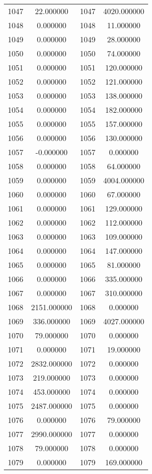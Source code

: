 \documentclass[12pt]{article}
\begin{document}
\begin{longtable}{@{}cccc@{}}
1047 & 22.000000 & 1047 & 4020.000000 \\
1048 & 0.000000 & 1048 & 11.000000 \\
1049 & 0.000000 & 1049 & 28.000000 \\
1050 & 0.000000 & 1050 & 74.000000 \\
1051 & 0.000000 & 1051 & 120.000000 \\
1052 & 0.000000 & 1052 & 121.000000 \\
1053 & 0.000000 & 1053 & 138.000000 \\
1054 & 0.000000 & 1054 & 182.000000 \\
1055 & 0.000000 & 1055 & 157.000000 \\
1056 & 0.000000 & 1056 & 130.000000 \\
1057 & -0.000000 & 1057 & 0.000000 \\
1058 & 0.000000 & 1058 & 64.000000 \\
1059 & 0.000000 & 1059 & 4004.000000 \\
1060 & 0.000000 & 1060 & 67.000000 \\
1061 & 0.000000 & 1061 & 129.000000 \\
1062 & 0.000000 & 1062 & 112.000000 \\
1063 & 0.000000 & 1063 & 109.000000 \\
1064 & 0.000000 & 1064 & 147.000000 \\
1065 & 0.000000 & 1065 & 81.000000 \\
1066 & 0.000000 & 1066 & 335.000000 \\
1067 & 0.000000 & 1067 & 310.000000 \\
1068 & 2151.000000 & 1068 & 0.000000 \\
1069 & 336.000000 & 1069 & 4027.000000 \\
1070 & 79.000000 & 1070 & 0.000000 \\
1071 & 0.000000 & 1071 & 19.000000 \\
1072 & 2832.000000 & 1072 & 0.000000 \\
1073 & 219.000000 & 1073 & 0.000000 \\
1074 & 453.000000 & 1074 & 0.000000 \\
1075 & 2487.000000 & 1075 & 0.000000 \\
1076 & 0.000000 & 1076 & 79.000000 \\
1077 & 2990.000000 & 1077 & 0.000000 \\
1078 & 79.000000 & 1078 & 0.000000 \\
1079 & 0.000000 & 1079 & 169.000000 \\

\end{longtable}
\end{document}
